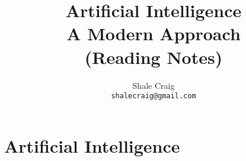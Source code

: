 \ifdefined\isphone
  
\else
  
\fi




\title{Artificial Intelligence \\ A Modern Approach \\ (Reading Notes)}

\author{
    Shale Craig\\
    \texttt{shalecraig@gmail.com}
}

\maketitle

\tableofcontents

\part{Artificial Intelligence}






